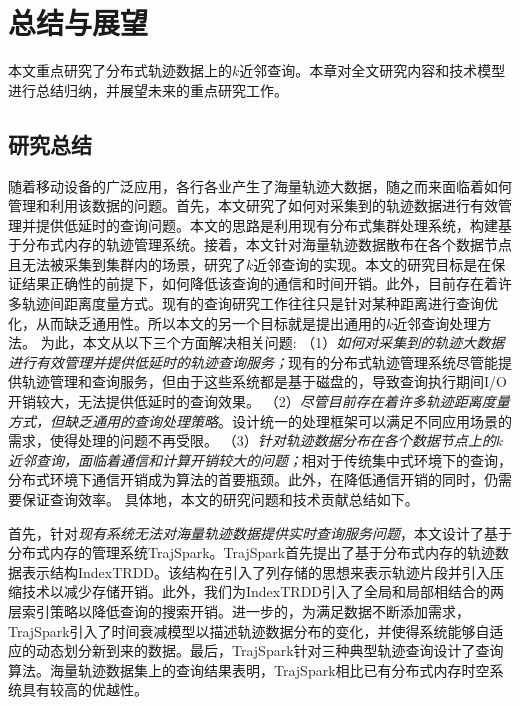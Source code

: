 \chapter{总结与展望}

本文重点研究了分布式轨迹数据上的$k$近邻查询。本章对全文研究内容和技术模型进行总结归纳，并展望未来的重点研究工作。

\section{研究总结}

随着移动设备的广泛应用，各行各业产生了海量轨迹大数据，随之而来面临着如何管理和利用该数据的问题。首先，本文研究了如何对采集到的轨迹数据进行有效管理并提供低延时的查询问题。本文的思路是利用现有分布式集群处理系统，构建基于分布式内存的轨迹管理系统。接着，本文针对海量轨迹数据散布在各个数据节点且无法被采集到集群内的场景，研究了$k$近邻查询的实现。本文的研究目标是在保证结果正确性的前提下，如何降低该查询的通信和时间开销。此外，目前存在着许多轨迹间距离度量方式。现有的查询研究工作往往只是针对某种距离进行查询优化，从而缺乏通用性。所以本文的另一个目标就是提出通用的$k$近邻查询处理方法。
为此，本文从以下三个方面解决相关问题:
（1）\textit{如何对采集到的轨迹大数据进行有效管理并提供低延时的轨迹查询服务；}现有的分布式轨迹管理系统尽管能提供轨迹管理和查询服务，但由于这些系统都是基于磁盘的，导致查询执行期间I/O开销较大，无法提供低延时的查询效果。
（2）\textit{尽管目前存在着许多轨迹距离度量方式，但缺乏通用的查询处理策略}。设计统一的处理框架可以满足不同应用场景的需求，使得处理的问题不再受限。
（3）\textit{针对轨迹数据分布在各个数据节点上的$k$近邻查询，面临着通信和计算开销较大的问题；}相对于传统集中式环境下的查询，分布式环境下通信开销成为算法的首要瓶颈。此外，在降低通信开销的同时，仍需要保证查询效率。	
具体地，本文的研究问题和技术贡献总结如下。

首先，针对\textit{现有系统无法对海量轨迹数据提供实时查询服务问题}，本文设计了基于分布式内存的管理系统TrajSpark。TrajSpark首先提出了基于分布式内存的轨迹数据表示结构IndexTRDD。该结构在引入了列存储的思想来表示轨迹片段并引入压缩技术以减少存储开销。此外，我们为IndexTRDD引入了全局和局部相结合的两层索引策略以降低查询的搜索开销。进一步的，为满足数据不断添加需求，TrajSpark引入了时间衰减模型以描述轨迹数据分布的变化，并使得系统能够自适应的动态划分新到来的数据。最后，TrajSpark针对三种典型轨迹查询设计了查询算法。海量轨迹数据集上的查询结果表明，TrajSpark相比已有分布式内存时空系统具有较高的优越性。

